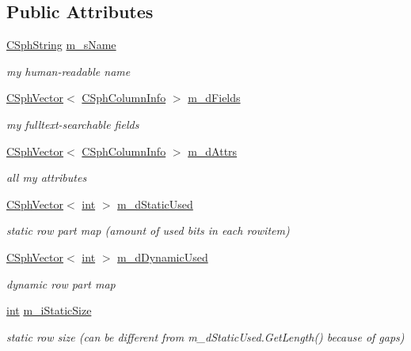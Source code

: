 \subsection*{Public Attributes}
\begin{DoxyCompactItemize}
\item 
\hyperlink{structCSphString}{C\-Sph\-String} \hyperlink{classCSphSchema_ab00ee49c53efc1c7cca2a3bafdd32e5b}{m\-\_\-s\-Name}
\begin{DoxyCompactList}\small\item\em my human-\/readable name \end{DoxyCompactList}\item 
\hyperlink{classCSphVector}{C\-Sph\-Vector}$<$ \hyperlink{structCSphColumnInfo}{C\-Sph\-Column\-Info} $>$ \hyperlink{classCSphSchema_a5bc8bc08c16e65a336cf3a90e721de73}{m\-\_\-d\-Fields}
\begin{DoxyCompactList}\small\item\em my fulltext-\/searchable fields \end{DoxyCompactList}\item 
\hyperlink{classCSphVector}{C\-Sph\-Vector}$<$ \hyperlink{structCSphColumnInfo}{C\-Sph\-Column\-Info} $>$ \hyperlink{classCSphSchema_a94fe33df4b82a02dd2581053d0832331}{m\-\_\-d\-Attrs}
\begin{DoxyCompactList}\small\item\em all my attributes \end{DoxyCompactList}\item 
\hyperlink{classCSphVector}{C\-Sph\-Vector}$<$ \hyperlink{sphinxexpr_8cpp_a4a26e8f9cb8b736e0c4cbf4d16de985e}{int} $>$ \hyperlink{classCSphSchema_a320ab896c9b8e29a71a91d2eff830773}{m\-\_\-d\-Static\-Used}
\begin{DoxyCompactList}\small\item\em static row part map (amount of used bits in each rowitem) \end{DoxyCompactList}\item 
\hyperlink{classCSphVector}{C\-Sph\-Vector}$<$ \hyperlink{sphinxexpr_8cpp_a4a26e8f9cb8b736e0c4cbf4d16de985e}{int} $>$ \hyperlink{classCSphSchema_abc2a31434964af188a792a209c5da8c3}{m\-\_\-d\-Dynamic\-Used}
\begin{DoxyCompactList}\small\item\em dynamic row part map \end{DoxyCompactList}\item 
\hyperlink{sphinxexpr_8cpp_a4a26e8f9cb8b736e0c4cbf4d16de985e}{int} \hyperlink{classCSphSchema_a76308bc7520f1114f074351fac29d106}{m\-\_\-i\-Static\-Size}
\begin{DoxyCompactList}\small\item\em static row size (can be different from m\-\_\-d\-Static\-Used.\-Get\-Length() because of gaps) \end{DoxyCompactList}\end{DoxyCompactItemize}
